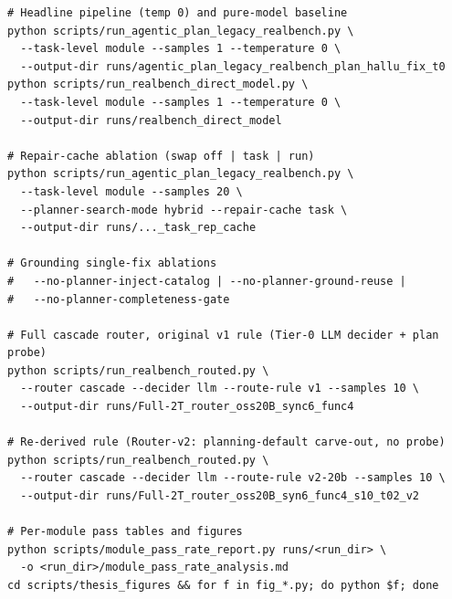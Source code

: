 \begin{lstlisting}[language={},caption={Reproducing the principal
experimental arms.},label={lst:repro}]
# Headline pipeline (temp 0) and pure-model baseline
python scripts/run_agentic_plan_legacy_realbench.py \
  --task-level module --samples 1 --temperature 0 \
  --output-dir runs/agentic_plan_legacy_realbench_plan_hallu_fix_t0
python scripts/run_realbench_direct_model.py \
  --task-level module --samples 1 --temperature 0 \
  --output-dir runs/realbench_direct_model

# Repair-cache ablation (swap off | task | run)
python scripts/run_agentic_plan_legacy_realbench.py \
  --task-level module --samples 20 \
  --planner-search-mode hybrid --repair-cache task \
  --output-dir runs/..._task_rep_cache

# Grounding single-fix ablations
#   --no-planner-inject-catalog | --no-planner-ground-reuse |
#   --no-planner-completeness-gate

# Full cascade router, original v1 rule (Tier-0 LLM decider + plan probe)
python scripts/run_realbench_routed.py \
  --router cascade --decider llm --route-rule v1 --samples 10 \
  --output-dir runs/Full-2T_router_oss20B_sync6_func4

# Re-derived rule (Router-v2: planning-default carve-out, no probe)
python scripts/run_realbench_routed.py \
  --router cascade --decider llm --route-rule v2-20b --samples 10 \
  --output-dir runs/Full-2T_router_oss20B_syn6_func4_s10_t02_v2

# Per-module pass tables and figures
python scripts/module_pass_rate_report.py runs/<run_dir> \
  -o <run_dir>/module_pass_rate_analysis.md
cd scripts/thesis_figures && for f in fig_*.py; do python $f; done
\end{lstlisting}

